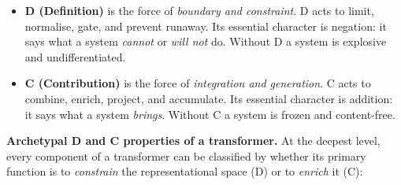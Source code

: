 \documentclass[
  11pt,
  letterpaper,
]{article}
\providecommand{\tightlist}{%
  \setlength{\itemsep}{0pt}\setlength{\parskip}{0pt}}
\begin{document}
\begin{itemize}
\tightlist
\item
  \textbf{D (Definition)} is the force of \emph{boundary and
  constraint}. D acts to limit, normalise, gate, and prevent runaway.
  Its essential character is negation: it says what a system
  \emph{cannot} or \emph{will not} do. Without D a system is explosive
  and undifferentiated.
\item
  \textbf{C (Contribution)} is the force of \emph{integration and
  generation}. C acts to combine, enrich, project, and accumulate. Its
  essential character is addition: it says what a system \emph{brings}.
  Without C a system is frozen and content-free.
\end{itemize}

\textbf{Archetypal D and C properties of a transformer.} At the deepest
level, every component of a transformer can be classified by whether its
primary function is to \emph{constrain} the representational space (D)
or to \emph{enrich} it (C):
\end{document}
